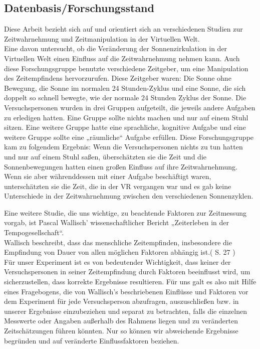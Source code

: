 \documentclass{Paper}
\begin{document}
\subsection{Datenbasis/Forschungsstand}
Diese Arbeit bezieht sich auf und orientiert sich an verschiedenen Studien zur Zeitwahrnehmung und Zeitmanipulation in der Virtuellen Welt. \\
Eine davon untersucht, ob die Veränderung der Sonnenzirkulation in der Virtuellen Welt einen Einfluss auf die Zeitwahrnehmung nehmen kann. Auch diese Forschungsgruppe benutzte verschiedene Zeitgeber, um eine Manipulation des Zeitempfindens hervorzurufen. Diese Zeitgeber waren: Die Sonne ohne Bewegung, die Sonne im normalen 24 Stunden-Zyklus und eine Sonne, die sich doppelt so schnell bewegte, wie der normale 24 Stunden Zyklus der Sonne. Die Versuchspersonen wurden in drei Gruppen aufgeteilt, die jeweils andere Aufgaben zu erledigen hatten. Eine Gruppe sollte nichts machen und nur auf einem Stuhl sitzen. Eine weitere Gruppe hatte eine sprachliche, kognitive Aufgabe und eine weitere Gruppe sollte eine „räumliche“ Aufgabe erfüllen.
Diese Forschungsgruppe kam zu folgendem Ergebnis: Wenn die Versuchspersonen nichts zu tun hatten und nur auf einem Stuhl saßen, überschätzten sie die Zeit und die Sonnenbewegungen hatten einen großen Einfluss auf ihre Zeitwahrnehmung. Wenn sie aber währenddessen mit einer Aufgabe beschäftigt waren, unterschätzten sie die Zeit, die in der VR vergangen war und es gab keine Unterschiede in der Zeitwahrnehmung zwischen den verschiedenen Sonnenzyklen.
\par
Eine weitere Studie, die uns wichtige, zu beachtende Faktoren zur Zeitmessung vorgab, ist Pascal Wallisch' wissenschaftlicher Bericht „Zeiterleben in der Tempogesellschaft“.  \\
Wallisch beschreibt, \glqq dass das menschliche Zeitempfinden, insbesondere die Empfindung von Dauer von allen möglichen Faktoren abhängig ist\grqq .( S. 27 ) \\
Für unser Experiment ist es von bedeutender Wichtigkeit, dass keiner der Versuchspersonen in seiner Zeitempfindung durch Faktoren beeinflusst wird, um sicherzustellen, dass korrekte Ergebnisse resultieren.
Für uns galt es also mit Hilfe eines Fragebogens, die von Wallisch’s beschriebenen Einflüsse und Faktoren vor dem Experiment für jede Versuchsperson abzufragen, auszuschließen bzw. in unserer Ergebnisse einzubeziehen und separat zu betrachten, falls die einzelnen Messwerte oder Angaben außerhalb des Rahmens liegen und zu veränderten Zeitschätzungen führen könnten. Nur so können wir abweichende Ergebnisse begründen und auf veränderte Einflussfaktoren beziehen.\\
\end{document}

